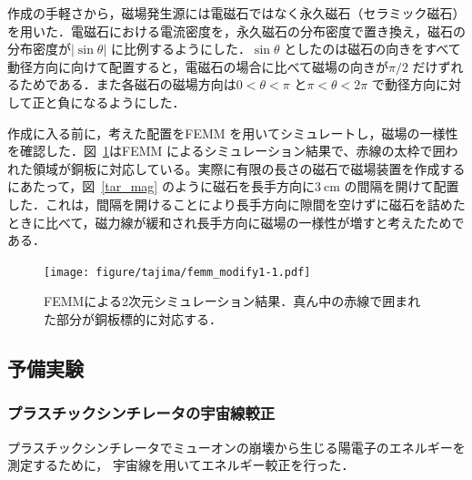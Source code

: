 作成の手軽さから，磁場発生源には電磁石ではなく永久磁石（セラミック磁石）を用いた．電磁石における電流密度を，永久磁石の分布密度で置き換え，磁石の分布密度が$|\sin\theta|$ に比例するようにした．$\sin\theta$ としたのは磁石の向きをすべて動径方向に向けて配置すると，電磁石の場合に比べて磁場の向きが$\pi/2$ だけずれるためである．また各磁石の磁場方向は$0 < \theta < \pi$ と$\pi < \theta < 2\pi$ で動径方向に対して正と負になるようにした．

作成に入る前に，考えた配置をFEMM を用いてシミュレートし，磁場の一様性を確認した．図~\ref{femm}はFEMM によるシミュレーション結果で、赤線の太枠で囲われた領域が銅板に対応している。実際に有限の長さの磁石で磁場装置を作成するにあたって，図~\ref{tar_mag} のように磁石を長手方向に$3~\mathrm{cm}$ の間隔を開けて配置した．これは，間隔を開けることにより長手方向に隙間を空けずに磁石を詰めたときに比べて，磁力線が緩和され長手方向に磁場の一様性が増すと考えたためである．

\begin{figure}[H]
\centering
\texttt{[image: figure/tajima/femm\_modify1-1.pdf]}
\caption{FEMMによる2次元シミュレーション結果．真ん中の赤線で囲まれた部分が銅板標的に対応する．}\label{femm}
\end{figure}


\newpage

\subsection{予備実験}

\subsubsection{プラスチックシンチレータの宇宙線較正}
プラスチックシンチレータでミューオンの崩壊から生じる陽電子のエネルギーを測定するために， 宇宙線を用いてエネルギー較正を行った．

